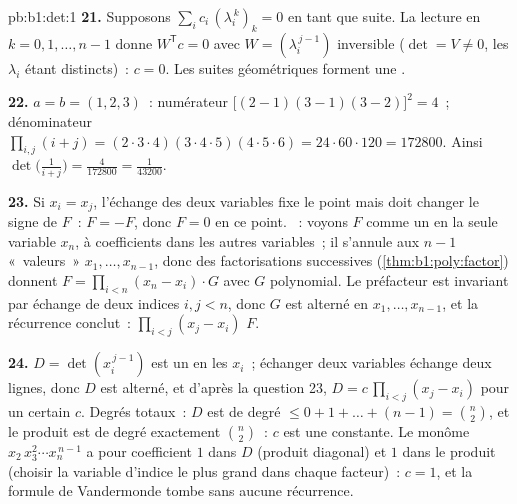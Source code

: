 \begin{solution}{pb:b1:det:1}
\textbf{21.} Supposons $\sum_i c_i\,(\lambda_i^{\,k})_{k} = 0$ en tant
que suite. La lecture en $k = 0, 1, \dots, n-1$ donne $W^{\mathsf
T}c = 0$ avec $W = (\lambda_i^{\,j-1})$ inversible ($\det = V
\neq 0$, les $\lambda_i$ étant distincts)~: $c = 0$. Les suites
géométriques forment une .

\textbf{22.} $a = b = (1, 2, 3)$~: numérateur $\bigl[(2-1)(3-1)
(3-2)\bigr]^2 = 4$~; dénominateur $\prod_{i,j}(i + j) =
(2\cdot3\cdot4)(3\cdot4\cdot5)(4\cdot5\cdot6) = 24\cdot60\cdot120
= 172800$. Ainsi $\det\bigl(\frac1{i+j}\bigr) = \frac{4}{172800}
= \frac1{43200}$.

\textbf{23.} Si $x_i = x_j$, l'échange des deux variables fixe le
point mais doit changer le signe de $F$~: $F = -F$, donc $F = 0$ en ce
point. ~: voyons $F$ comme un  en la seule
variable $x_n$, à coefficients dans les autres variables~; il s'annule
aux $n - 1$ «~valeurs~» $x_1, \dots, x_{n-1}$, donc des
factorisations successives (\cref{thm:b1:poly:factor}) donnent $F =
\prod_{i<n}(x_n - x_i)\cdot G$ avec $G$ polynomial. Le
préfacteur est invariant par échange de deux indices $i, j < n$, donc
$G$ est alterné en $x_1, \dots, x_{n-1}$, et la récurrence
conclut~: $\prod_{i<j}(x_j - x_i)$  $F$.

\textbf{24.} $D = \det(x_i^{\,j-1})$ est un  en les
$x_i$~; échanger deux variables échange deux lignes, donc $D$ est
alterné, et d'après la question 23, $D = c\,\prod_{i<j}(x_j - x_i)$
pour un certain  $c$. Degrés totaux~: $D$ est de degré
$\leq 0 + 1 + \dots + (n-1) = \binom n2$, et le produit est de degré
exactement $\binom n2$~: $c$ est une constante. Le monôme
$x_2\,x_3^2\cdots x_n^{\,n-1}$ a pour coefficient $1$ dans $D$
(produit diagonal) et $1$ dans le produit (choisir la variable
d'indice le plus grand dans chaque facteur)~: $c = 1$, et la formule de
Vandermonde tombe sans aucune récurrence.


\end{solution}
